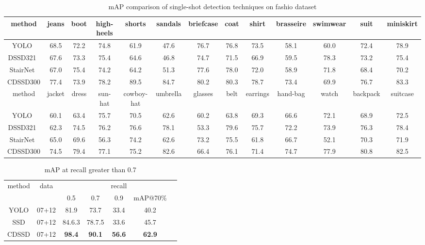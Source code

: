 \documentclass[sigconf]{acmart}
\begin{document}
\begin{table*}[t]
  \small
  \centering
  \caption{mAP comparison of single-shot detection techniques on fashio dataset}
\begin{tabular}{c | c  c  c   c  c  c  c  c  c  c  c  c }
method & jeans & boot & high-heels & shorts & sandals & briefcase & coat & shirt & brasseire & swimwear & suit & miniskirt\\
\hline
YOLO~\cite{LiuAESRFB16} &  68.5 &  72.2 & 74.8 & 61.9 &  47.6 & 76.7 & 76.8 & 73.5 &  58.1 & 60.0 & 72.4 & 78.9 \\
DSSD321~\cite{FuLRTB17} & 67.6 & 73.3 & 75.4 &  64.6 & 46.8 &  74.7 &  71.5 &  66.9 & 59.5 & 78.3 & 73.2 & 75.4\\  
StairNet~\cite{stairnet17} & 67.0 & 75.4 & 74.2 &  64.2 & 51.3 &  77.6 &  78.0 &  72.0 & 58.9 & 71.8 & 68.4 & 70.2 \\  
CDSSD300 & 77.4 & 73.9 & 78.2 & 89.5 & 84.7 & 80.2 & 80.3 & 78.7 & 73.4 & 69.9 & 76.7 & 83.3\\
\hline
\hline
method & jacket & dress & sun-hat & cowboy-hat & umbrella & glasses & belt & earrings & hand-bag & watch & backpack & suitcase \\
\hline
YOLO~\cite{LiuAESRFB16} & 60.1 & 63.4 & 75.7 & 70.5 & 62.6 & 60.2 & 63.8 & 69.3 &  66.6 & 72.1 & 68.9 & 72.5\\
DSSD321~\cite{FuLRTB17} & 62.3 & 74.5 & 76.2 & 76.6 &  78.1 &  53.3 &  79.6 &  75.7 &  72.2 & 73.9 & 76.3 & 78.4\\
StairNet~\cite{stairnet17} & 65.0 & 69.6 & 56.3 &  74.2 & 62.6 &  73.2 &  75.5 &  61.8 & 66.7 & 52.1 & 70.3 & 71.9\\  
CDSSD300 &  74.5 & 79.4 & 77.1 & 75.2 & 82.6 & 66.4 & 76.1 & 71.4 & 74.7 & 77.9 & 80.8 & 82.5 \\
\hline
\hline
\end{tabular}
  \label{tab:fashiontest}
\end{table*}

\begin{table*}
  \centering
  \caption{mAP at recall greater than 0.7} 
\begin{small}
\begin{tabular}{c | c | c c  c  c | c }
method & data & & & recall &\\
 & & 0.5 & 0.7 & 0.9 & mAP@70\%\\           
\hline
YOLO  & 07+12 & 81.9 & 73.7 & 33.4 & 40.2 \\
SSD & 07+12 & 84.6.3 & 78.7.5 & 33.6 & 45.7 \\
CDSSD & 07+12 & \textbf{98.4} & \textbf{90.1} & \textbf{56.6} & \textbf{62.9} \\
\hline
\end{tabular}
\end{small}
  \label{tab:precision-recall}
\end{table*}
\end{document}
